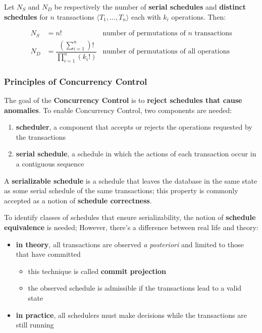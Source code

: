 \documentclass[english]{article}
\begin{document}
Let \(N_S\) and \(N_D\) be respectively the number of \textbf{serial schedules} and \textbf{distinct schedules} for \(n\) transactions \(\langle T_1, \dots, T_n \rangle\) each with \(k_i\) operations.
Then:

\begin{align*}
  N_S & = n!                                                                                        \quad & \text{number of permutations of } n \text{ transactions} \\[0.5ex]
  N_D & = \dfrac{\displaystyle \left(\sum_{i=1}^{n}\right)!}{\displaystyle \prod_{i=1}^{n} (k_i!)}        & \text{number of permutations of all operations}
\end{align*}

\subsubsection{Principles of Concurrency Control}

The goal of the \textbf{Concurrency Control} is to \textbf{reject schedules that cause anomalies}.
To enable Concurrency Control, two components are needed:

\begin{enumerate}
  \item \textbf{scheduler}, a component that accepts or rejects the operations requested by the transactions
  \item \textbf{serial schedule}, a schedule in which the actions of each transaction occur in a contiguous sequence
\end{enumerate}

\bigskip
A \textbf{serializable schedule} is a schedule that leaves the database in the same state as some serial schedule of the same transactions;
this property is commonly accepted as a notion of \textbf{schedule correctness}.

To identify classes of schedules that ensure serializability, the notion of \textbf{schedule equivalence} is needed;
However, there's a difference between real life and theory:

\begin{itemize}
  \item \textbf{in theory}, all transactions are observed \textit{a posteriori} and limited to those that have committed
        \begin{itemize}
          \item this technique is called \textbf{commit projection}
          \item the observed schedule is admissible if the transactions lead to a valid state
        \end{itemize}
  \item \textbf{in practice}, all schedulers must make decisions while the transactions are still running
\end{itemize}
\end{document}
